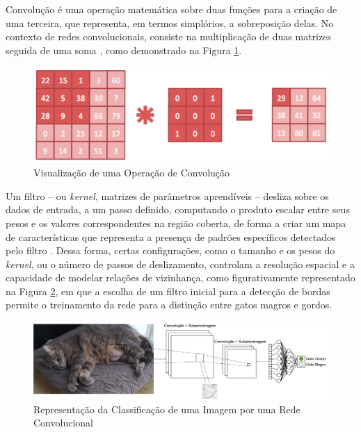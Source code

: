 Convolução é uma operação matemática sobre duas funções para a criação de uma terceira, que representa, em termos simplórios, a sobreposição delas. No contexto de redes convolucionais, consiste na multiplicação de duas matrizes seguida de uma soma \cite{origindl}, como demonstrado na Figura \ref{fig:convolution}.

\begin{figure}[H]
	\caption{\label{fig:convolution}Visualização de uma Operação de Convolução}
    \begin{center}
    \includegraphics[width=0.75\linewidth]{images/convolution.png}
	\end{center}
\end{figure}


Um filtro -- ou \textit{kernel}, matrizes de parâmetros aprendíveis -- desliza sobre os dados de entrada, a um passo definido, computando o produto escalar entre seus pesos e os valores correspondentes na região coberta, de forma a criar um mapa de características que representa a presença de padrões específicos detectados pelo filtro \cite{deeplearningbook}. Dessa forma, certas configurações, como o tamanho e os pesos do \textit{kernel}, ou o número de passos de deslizamento, controlam a resolução espacial e a capacidade de modelar relações de vizinhança, como figurativamente representado na Figura \ref{fig:nono}, em que a escolha de um filtro inicial para a detecção de bordas permite o treinamento da rede para a distinção entre gatos magros e gordos.

\begin{figure}[H]
	\caption{\label{fig:nono}Representação da Classificação de uma Imagem por uma Rede Convolucional}
    \begin{center}
    \includegraphics[width=1\linewidth]{images/nono.png}
	\end{center}
\end{figure}

